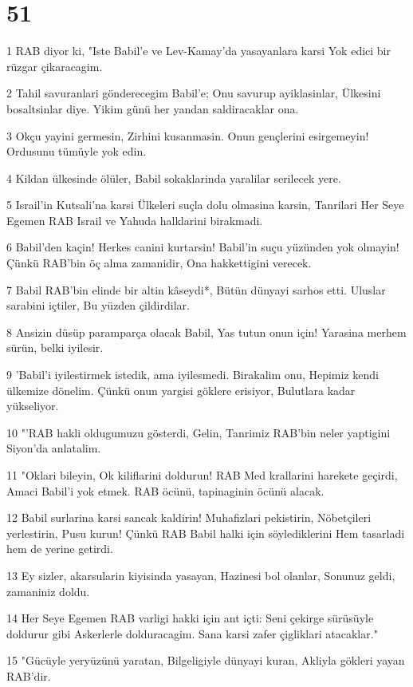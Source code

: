 \chapter{51}

\par 1 RAB diyor ki, "Iste Babil'e ve Lev-Kamay'da yasayanlara karsi Yok edici bir rüzgar çikaracagim.
\par 2 Tahil savuranlari gönderecegim Babil'e; Onu savurup ayiklasinlar, Ülkesini bosaltsinlar diye. Yikim günü her yandan saldiracaklar ona.
\par 3 Okçu yayini germesin, Zirhini kusanmasin. Onun gençlerini esirgemeyin! Ordusunu tümüyle yok edin.
\par 4 Kildan ülkesinde ölüler, Babil sokaklarinda yaralilar serilecek yere.
\par 5 Israil'in Kutsali'na karsi Ülkeleri suçla dolu olmasina karsin, Tanrilari Her Seye Egemen RAB Israil ve Yahuda halklarini birakmadi.
\par 6 Babil'den kaçin! Herkes canini kurtarsin! Babil'in suçu yüzünden yok olmayin! Çünkü RAB'bin öç alma zamanidir, Ona hakkettigini verecek.
\par 7 Babil RAB'bin elinde bir altin kâseydi*, Bütün dünyayi sarhos etti. Uluslar sarabini içtiler, Bu yüzden çildirdilar.
\par 8 Ansizin düsüp paramparça olacak Babil, Yas tutun onun için! Yarasina merhem sürün, belki iyilesir.
\par 9 'Babil'i iyilestirmek istedik, ama iyilesmedi. Birakalim onu, Hepimiz kendi ülkemize dönelim. Çünkü onun yargisi göklere erisiyor, Bulutlara kadar yükseliyor.
\par 10 "'RAB hakli oldugumuzu gösterdi, Gelin, Tanrimiz RAB'bin neler yaptigini Siyon'da anlatalim.
\par 11 "Oklari bileyin, Ok kiliflarini doldurun! RAB Med krallarini harekete geçirdi, Amaci Babil'i yok etmek. RAB öcünü, tapinaginin öcünü alacak.
\par 12 Babil surlarina karsi sancak kaldirin! Muhafizlari pekistirin, Nöbetçileri yerlestirin, Pusu kurun! Çünkü RAB Babil halki için söylediklerini Hem tasarladi hem de yerine getirdi.
\par 13 Ey sizler, akarsularin kiyisinda yasayan, Hazinesi bol olanlar, Sonunuz geldi, zamaniniz doldu.
\par 14 Her Seye Egemen RAB varligi hakki için ant içti: Seni çekirge sürüsüyle doldurur gibi Askerlerle dolduracagim. Sana karsi zafer çigliklari atacaklar."
\par 15 "Gücüyle yeryüzünü yaratan, Bilgeligiyle dünyayi kuran, Akliyla gökleri yayan RAB'dir.
